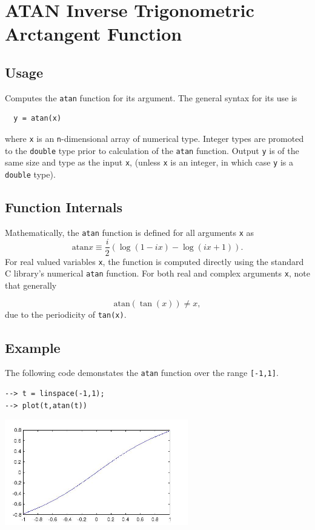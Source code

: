 \section{ATAN Inverse Trigonometric Arctangent Function}

\subsection{Usage}

Computes the \verb|atan| function for its argument.  The general
syntax for its use is
\begin{verbatim}
  y = atan(x)
\end{verbatim}
where \verb|x| is an \verb|n|-dimensional array of numerical type.
Integer types are promoted to the \verb|double| type prior to
calculation of the \verb|atan| function.  Output \verb|y| is of the
same size and type as the input \verb|x|, (unless \verb|x| is an
integer, in which case \verb|y| is a \verb|double| type).  
\subsection{Function Internals}

Mathematically, the \verb|atan| function is defined for all 
arguments \verb|x| as
\[
   \mathrm{atan} x \equiv \frac{i}{2}\left(\log(1-i x) - \log(i x + 1)\right).
\]
For real valued variables \verb|x|, the function is computed directly using 
the standard C library's numerical \verb|atan| function. For both 
real and complex arguments \verb|x|, note that generally

\[
    \mathrm{atan}(\tan(x)) \neq x,
\]
 due to the periodicity of \verb|tan(x)|.
\subsection{Example}

The following code demonstates the \verb|atan| function over the range 
\verb|[-1,1]|.
\begin{verbatim}
--> t = linspace(-1,1);
--> plot(t,atan(t))
\end{verbatim}


\centerline{\includegraphics[width=8cm]{atanplot}}

